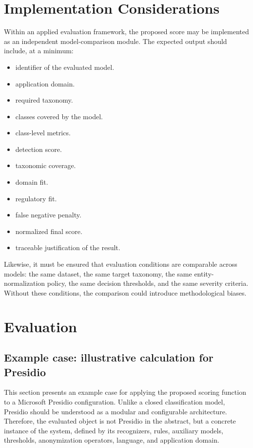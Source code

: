 \documentclass[11pt,a4paper]{article}
\begin{document}
\section{Implementation Considerations}

Within an applied evaluation framework, the proposed score may be implemented as an independent model-comparison module. The expected output should include, at a minimum:

\begin{itemize}
    \item identifier of the evaluated model.
    \item application domain.
    \item required taxonomy.
    \item classes covered by the model.
    \item class-level metrics.
    \item detection score.
    \item taxonomic coverage.
    \item domain fit.
    \item regulatory fit.
    \item false negative penalty.
    \item normalized final score.
    \item traceable justification of the result.
\end{itemize}

Likewise, it must be ensured that evaluation conditions are comparable across models: the same dataset, the same target taxonomy, the same entity-normalization policy, the same decision thresholds, and the same severity criteria. Without these conditions, the comparison could introduce methodological biases.

\section{Evaluation}

\subsection{Example case: illustrative calculation for Presidio}

\label{sec:presidio_example}

This section presents an example case for applying the proposed scoring function to a Microsoft Presidio configuration. Unlike a closed classification model, Presidio should be understood as a modular and configurable architecture. Therefore, the evaluated object is not Presidio in the abstract, but a concrete instance of the system, defined by its recognizers, rules, auxiliary models, thresholds, anonymization operators, language, and application domain.
\end{document}
